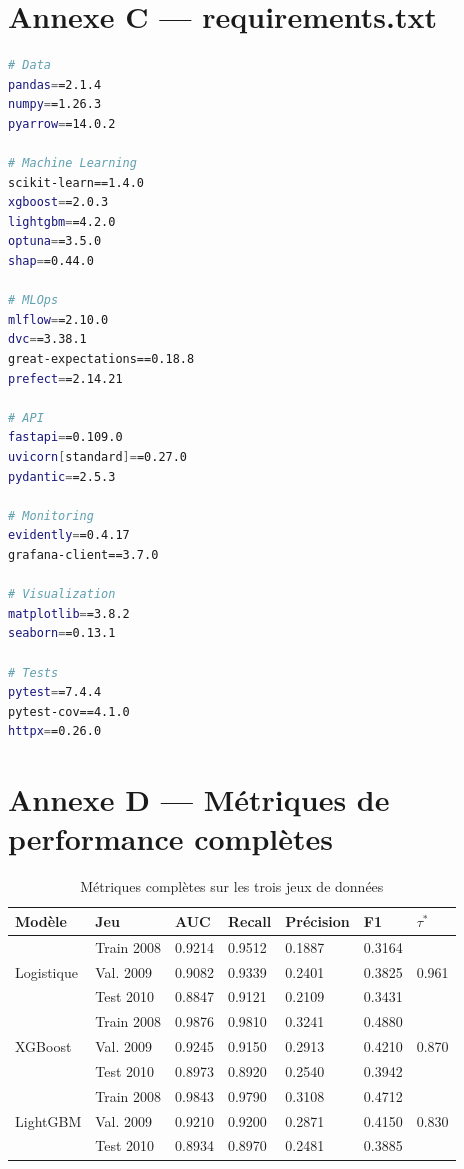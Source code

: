 \section*{Annexe C --- requirements.txt}
\label{ann:requirements}

\begin{lstlisting}[language=bash, caption={Dépendances Python du projet},
                   label={lst:requirements}]
# Data
pandas==2.1.4
numpy==1.26.3
pyarrow==14.0.2

# Machine Learning
scikit-learn==1.4.0
xgboost==2.0.3
lightgbm==4.2.0
optuna==3.5.0
shap==0.44.0

# MLOps
mlflow==2.10.0
dvc==3.38.1
great-expectations==0.18.8
prefect==2.14.21

# API
fastapi==0.109.0
uvicorn[standard]==0.27.0
pydantic==2.5.3

# Monitoring
evidently==0.4.17
grafana-client==3.7.0

# Visualization
matplotlib==3.8.2
seaborn==0.13.1

# Tests
pytest==7.4.4
pytest-cov==4.1.0
httpx==0.26.0
\end{lstlisting}

\section*{Annexe D --- Métriques de performance complètes}
\label{ann:metriques}

\begin{table}[htbp]
\centering
\caption{Métriques complètes sur les trois jeux de données}
\label{tab:metriques_completes}
\begin{tabular}{@{}lllllll@{}}
\toprule
\textbf{Modèle} & \textbf{Jeu} & \textbf{AUC} & \textbf{Recall} &
\textbf{Précision} & \textbf{F1} & \textbf{$\tau^*$} \\
\midrule
\multirow{3}{*}{Logistique}
  & Train 2008 & 0.9214 & 0.9512 & 0.1887 & 0.3164 & \multirow{3}{*}{0.961} \\
  & Val. 2009  & 0.9082 & 0.9339 & 0.2401 & 0.3825 & \\
  & Test 2010  & 0.8847 & 0.9121 & 0.2109 & 0.3431 & \\
\midrule
\multirow{3}{*}{XGBoost}
  & Train 2008 & 0.9876 & 0.9810 & 0.3241 & 0.4880 & \multirow{3}{*}{0.870} \\
  & Val. 2009  & 0.9245 & 0.9150 & 0.2913 & 0.4210 & \\
  & Test 2010  & 0.8973 & 0.8920 & 0.2540 & 0.3942 & \\
\midrule
\multirow{3}{*}{LightGBM}
  & Train 2008 & 0.9843 & 0.9790 & 0.3108 & 0.4712 & \multirow{3}{*}{0.830} \\
  & Val. 2009  & 0.9210 & 0.9200 & 0.2871 & 0.4150 & \\
  & Test 2010  & 0.8934 & 0.8970 & 0.2481 & 0.3885 & \\
\bottomrule
\end{tabular}
\end{table}

